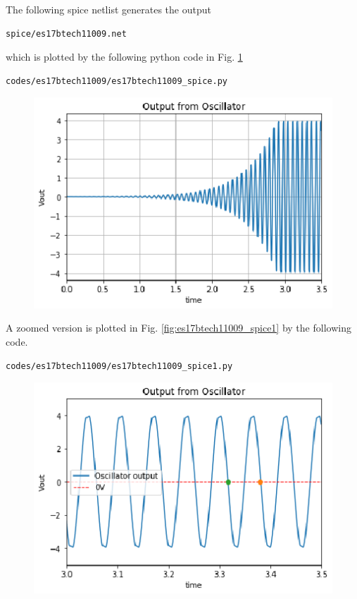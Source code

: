 \begin{enumerate}[label=\arabic*.,ref=\theenumi]
The following spice netlist generates the output
\begin{lstlisting}
spice/es17btech11009.net
\end{lstlisting}
which is plotted by the following python code  in Fig. \ref{fig:es17btech11009_spice}
%
\begin{lstlisting}
codes/es17btech11009/es17btech11009_spice.py
\end{lstlisting}
\begin{figure}[!ht]
\centering
\includegraphics[width=\columnwidth]{./figs/es17btech11009/es17btech11009_spice.eps}
\caption{}
\label{fig:es17btech11009_spice}
\end{figure}
A zoomed version is plotted in Fig. \ref{fig:es17btech11009_spice1} by the following code.
%
\begin{lstlisting}
codes/es17btech11009/es17btech11009_spice1.py
\end{lstlisting}
\begin{figure}[!ht]
\centering
\includegraphics[width=\columnwidth]{./figs/es17btech11009/es17btech11009_spice1.eps}

\end{figure}
\end{enumerate}
